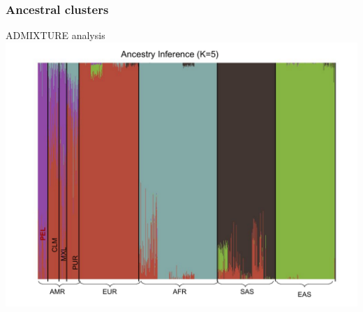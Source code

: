 \documentclass[11pt,xcolor=table]{beamer}
\begin{document}
\subsubsection{Ancestral clusters}
\begin{frame}{ADMIXTURE analysis}
\centering
\includegraphics[width=1.05\textwidth]{pics/g1k_admixture.pdf}
\end{frame}
\end{document}
